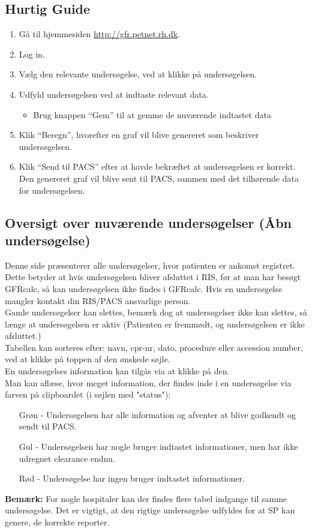 \documentclass{article}
\begin{document}
\subsection{Hurtig Guide}
\begin{enumerate}
	\item Gå til hjemmesiden \url{http://gfr.petnet.rh.dk}.
	\item Log in.
	\item Vælg den relevante undersøgelse, ved at klikke på undersøgelsen.
	\item Udfyld undersøgelsen ved at indtaste relevant data.
	\begin{itemize}
		\item Brug knappen “Gem” til at gemme de nuværende indtastet data
	\end{itemize}
	\item Klik “Beregn”, hvorefter en graf vil blive genereret som beskriver undersøgelsen.
	\item Klik “Send til PACS” efter at havde bekræftet at undersøgelsen er korrekt. Den genereret graf vil blive sent til PACS, sammen med det tilhørende data for undersøgelsen. 
\end{enumerate}  
\subsection{Oversigt over nuværende undersøgelser (Åbn undersøgelse)}\label{list_study}
Denne side præsenterer alle undersøgelser, hvor patienten er ankomst registret. Dette betyder at hvis undersøgelsen bliver afsluttet i RIS, før at man har besøgt GFRcalc, så kan undersøgelsen ikke findes i GFRcalc. Hvis en undersøgelse mangler kontakt din RIS/PACS ansvarlige person. \\

Gamle undersøgelser kan slettes, bemærk dog at undersøgelser ikke kan slettes, så længe at undersøgelsen er aktiv (Patienten er fremmødt, og undersøgelsen er ikke afsluttet.) \\

Tabellen kan sorteres efter: navn, cpr-nr, dato, procedure eller accession number, ved at klikke på toppen af den ønskede søjle. \\

En undersøgelses information kan tilgås via at klikke på den. \\

Man kan aflæse, hvor meget information, der findes inde i en undersøgelse via farven på clipboardet (i søjlen med "status"):
\begin{itemize}
	\item[Grøn] - Undersøgelsen har alle information og afventer at blive godkendt og sendt til PACS.
	\item[Gul] - Undersøgelsen har nogle bruger indtastet informationer, men har ikke udregnet clearance endnu. 
	\item[Rød] - Undersøgelse har ingen bruger indtastet informationer. 
\end{itemize} 
\textbf{Bemærk:} For nogle hospitaler kan der findes flere tabel indgange til samme undersøgelse. Det er vigtigt, at den rigtige undersøgelse udfyldes for at  SP kan genere, de korrekte reporter.
\end{document}
